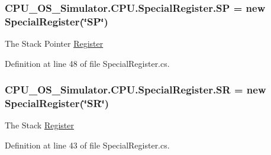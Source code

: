 \subsubsection[{S\+P}]{ C\+P\+U\+\_\+\+O\+S\+\_\+\+Simulator.\+C\+P\+U.\+Special\+Register.\+S\+P = new {\bf Special\+Register}(\char`\"{}S\+P\char`\"{})\hspace{0.3cm}{\ttfamily [static]}}\label{class_c_p_u___o_s___simulator_1_1_c_p_u_1_1_special_register_ae1699c7972763e73e3f1cfe467cc82e9}


The Stack Pointer \hyperlink{class_c_p_u___o_s___simulator_1_1_c_p_u_1_1_register}{Register} 



Definition at line 48 of file Special\+Register.\+cs.

\hypertarget{class_c_p_u___o_s___simulator_1_1_c_p_u_1_1_special_register_a556243e1c3c891e685bf884771c1575c}{}
\subsubsection[{S\+R}]{ C\+P\+U\+\_\+\+O\+S\+\_\+\+Simulator.\+C\+P\+U.\+Special\+Register.\+S\+R = new {\bf Special\+Register}(\char`\"{}S\+R\char`\"{})\hspace{0.3cm}{\ttfamily [static]}}\label{class_c_p_u___o_s___simulator_1_1_c_p_u_1_1_special_register_a556243e1c3c891e685bf884771c1575c}


The Stack \hyperlink{class_c_p_u___o_s___simulator_1_1_c_p_u_1_1_register}{Register} 



Definition at line 43 of file Special\+Register.\+cs.

\hypertarget{class_c_p_u___o_s___simulator_1_1_c_p_u_1_1_special_register_aae2bca6c1354013cca156bd19c30640d}{}
